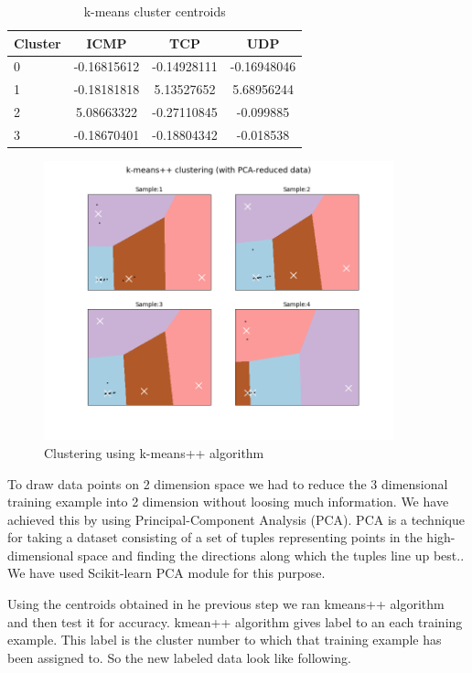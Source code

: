 \documentclass[10pt,oneside,a4paper]{article}
\begin{document}
\begin{table}[H]
\centering
  \begin{tabular}{ l | c  c  c }
    Cluster      & ICMP  & TCP  & UDP \\
    \hline
    0         &{-0.16815612}       &{-0.14928111}    &{-0.16948046} \\
    1         &{-0.18181818}       &{5.13527652}     &{5.68956244} \\
    2         &{5.08663322}        &{-0.27110845}    &{-0.099885} \\
    3         &{-0.18670401}       &{-0.18804342}    &{-0.018538} \\
  \end{tabular}
\caption{k-means cluster centroids} \label{table:centroids}
\end{table}

\begin{figure}[H]
\centering
\includegraphics[width=0.90\textwidth]{kemans-clustering.png}
\caption{Clustering using k-means++ algorithm} \label{fig:kmeans-clustering}
\end{figure}

To draw data points on 2 dimension space we had to reduce the 3 dimensional training example into 2 dimension without loosing much information. We have achieved this by using Principal-Component Analysis (PCA). PCA is a technique for taking a dataset consisting of a set of tuples representing points in the high-dimensional space and finding the directions along which the tuples line up best.\cite{pca}. We have used Scikit-learn PCA module for this purpose.

Using the centroids obtained in he previous step we ran kmeans++ algorithm and then test it for accuracy. kmean++ algorithm gives label to an each training example. This label is the cluster number to which that training example has been assigned to. So the new labeled data look like following.
\end{document}
